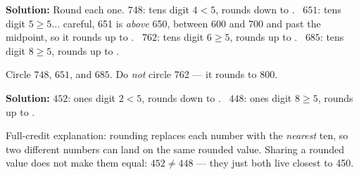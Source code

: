 \documentclass[12pt]{article}
\begin{document}

\textbf{Solution:} Round each one. $748$: tens digit $4 < 5$, rounds down to
. \ $651$: tens digit $5 \geq 5$... careful, 651 is \emph{above} 650,
between 600 and 700 and past the midpoint, so it rounds up to . \
$762$: tens digit $6 \geq 5$, rounds up to . \ $685$: tens digit
$8 \geq 5$, rounds up to \ans{700}.

Circle $748$, $651$, and $685$. Do \emph{not} circle 762 — it rounds to 800.


\textbf{Solution:} $452$: ones digit $2 < 5$, rounds down to . \
$448$: ones digit $8 \geq 5$, rounds up to .

Full-credit explanation: rounding replaces each number with the \emph{nearest}
ten, so two different numbers can land on the same rounded value. Sharing a
rounded value does not make them equal: $452 \neq 448$ — they just both live
closest to 450.
\end{document}
